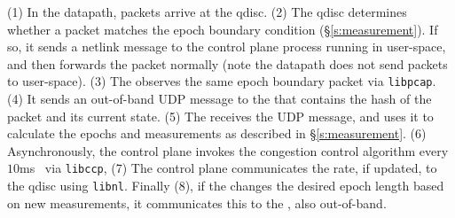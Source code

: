 (1) In the datapath, packets arrive at the \inbox qdisc.
(2) The qdisc determines whether a packet matches the epoch boundary condition (\S\ref{s:measurement}). 
If so, it sends a netlink message to the control plane process running in user-space, and then forwards the packet normally (note the datapath does not send packets to user-space). 
(3) The \outbox observes the same epoch boundary packet via \texttt{libpcap}.
(4) It sends an out-of-band UDP message to the \inbox that contains the hash of the packet and its current state. 
(5) The \inbox receives the UDP message, and uses it to calculate the epochs and measurements as described 
in \S\ref{s:measurement}. 
(6) Asynchronously, the \inbox control plane invokes the congestion control algorithm every $10$ms~\cite{ccp}
via \texttt{libccp},
(7) The \inbox control plane communicates the rate, if updated, to the qdisc
using \texttt{libnl}. 
Finally (8), if the \inbox changes the desired epoch length based on new measurements, it communicates this to the \outbox, also out-of-band.

